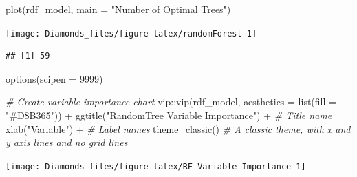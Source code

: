\documentclass[
]{article}
\newenvironment{Shaded}{\begin{snugshade}}{\end{snugshade}}
\newcommand{\AttributeTok}[1]{\textcolor[rgb]{0.77,0.63,0.00}{#1}}
\newcommand{\CommentTok}[1]{\textcolor[rgb]{0.56,0.35,0.01}{\textit{#1}}}
\newcommand{\ConstantTok}[1]{\textcolor[rgb]{0.00,0.00,0.00}{#1}}
\newcommand{\DecValTok}[1]{\textcolor[rgb]{0.00,0.00,0.81}{#1}}
\newcommand{\FunctionTok}[1]{\textcolor[rgb]{0.00,0.00,0.00}{#1}}
\newcommand{\NormalTok}[1]{#1}
\newcommand{\OtherTok}[1]{\textcolor[rgb]{0.56,0.35,0.01}{#1}}
\newcommand{\SpecialCharTok}[1]{\textcolor[rgb]{0.00,0.00,0.00}{#1}}
\newcommand{\StringTok}[1]{\textcolor[rgb]{0.31,0.60,0.02}{#1}}
\begin{document}
\begin{Shaded}
\begin{Highlighting}[]
\FunctionTok{plot}\NormalTok{(rdf\_model,}
         \AttributeTok{main =} \StringTok{"Number of Optimal Trees"}\NormalTok{)}
\end{Highlighting}
\end{Shaded}

\begin{center}\texttt{[image: Diamonds\_files/figure-latex/randomForest-1]} \end{center}

\begin{Shaded}
\end{Shaded}

\begin{verbatim}
## [1] 59
\end{verbatim}

\begin{Shaded}
\begin{Highlighting}[]
\FunctionTok{options}\NormalTok{(}\AttributeTok{scipen =} \DecValTok{9999}\NormalTok{)}

\CommentTok{\# Create variable importance chart}
\NormalTok{vip}\SpecialCharTok{::}\FunctionTok{vip}\NormalTok{(rdf\_model, }\AttributeTok{aesthetics =} \FunctionTok{list}\NormalTok{(}\AttributeTok{fill =} \StringTok{"\#D8B365"}\NormalTok{)) }\SpecialCharTok{+}
  \FunctionTok{ggtitle}\NormalTok{(}\StringTok{"RandomTree Variable Importance"}\NormalTok{) }\SpecialCharTok{+} \CommentTok{\# Title name}
  \FunctionTok{xlab}\NormalTok{(}\StringTok{"Variable"}\NormalTok{) }\SpecialCharTok{+} \CommentTok{\# Label names}
  \FunctionTok{theme\_classic}\NormalTok{() }\CommentTok{\# A classic theme, with x and y axis lines and no grid lines}
\end{Highlighting}
\end{Shaded}

\begin{center}\texttt{[image: Diamonds\_files/figure-latex/RF Variable Importance-1]} \end{center}

\begin{Shaded}
\end{Shaded}
\end{document}
